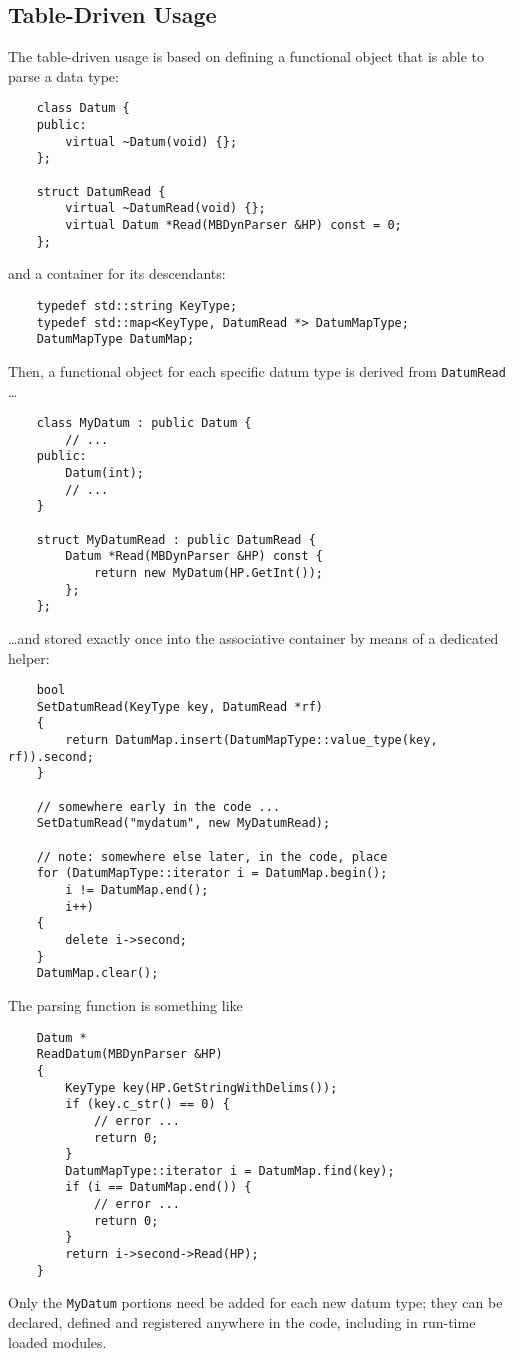 \documentclass[10pt,fleqn,subeqn]{report}
\begin{document}
\subsection{Table-Driven Usage}
The table-driven usage is based on defining a functional object 
that is able to parse a data type:
\begin{verbatim}
    class Datum {
    public:
        virtual ~Datum(void) {};
    };

    struct DatumRead {
        virtual ~DatumRead(void) {};
        virtual Datum *Read(MBDynParser &HP) const = 0;
    };
\end{verbatim}
and a container for its descendants:
\begin{verbatim}
    typedef std::string KeyType;
    typedef std::map<KeyType, DatumRead *> DatumMapType;
    DatumMapType DatumMap;
\end{verbatim}
Then, a functional object for each specific datum type is derived from
\texttt{DatumRead} \ldots
\begin{verbatim}
    class MyDatum : public Datum {
        // ...
    public:
        Datum(int);
        // ...
    }

    struct MyDatumRead : public DatumRead {
        Datum *Read(MBDynParser &HP) const {
            return new MyDatum(HP.GetInt());
        };
    };
\end{verbatim}
\ldots and stored exactly once into the associative container by means
of a dedicated helper:
\begin{verbatim}
    bool
    SetDatumRead(KeyType key, DatumRead *rf)
    {
        return DatumMap.insert(DatumMapType::value_type(key, rf)).second;
    }

    // somewhere early in the code ...
    SetDatumRead("mydatum", new MyDatumRead);

    // note: somewhere else later, in the code, place
    for (DatumMapType::iterator i = DatumMap.begin();
        i != DatumMap.end();
        i++)
    {
        delete i->second;
    }
    DatumMap.clear();
\end{verbatim}
The parsing function is something like
\begin{verbatim}
    Datum *
    ReadDatum(MBDynParser &HP)
    {
        KeyType key(HP.GetStringWithDelims());
        if (key.c_str() == 0) {
            // error ...
            return 0;
        }
        DatumMapType::iterator i = DatumMap.find(key);
        if (i == DatumMap.end()) {
            // error ...
            return 0;
        }
        return i->second->Read(HP);
    }
\end{verbatim}
Only the \texttt{MyDatum} portions need be added for each new datum type;
they can be declared, defined and registered anywhere in the code,
including in run-time loaded modules.
\end{document}
